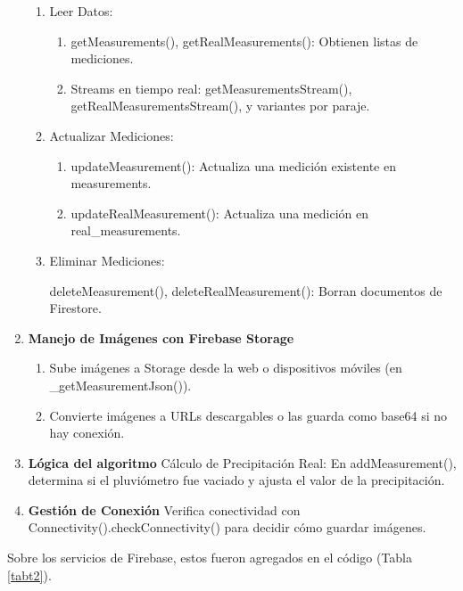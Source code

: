 \begin{enumerate}
\begin{enumerate}
    \item Leer Datos:
    
    \begin{enumerate}
    \item getMeasurements(), getRealMeasurements(): Obtienen listas de mediciones.
    
    \item Streams en tiempo real: getMeasurementsStream(), getRealMeasurementsStream(), y variantes por paraje.
    \end{enumerate}
    
    \item Actualizar Mediciones:
    
    \begin{enumerate}
      \item updateMeasurement(): Actualiza una medición existente en measurements.
    
    \item updateRealMeasurement(): Actualiza una medición en real\_measurements.
    \end{enumerate}
    
    \item Eliminar Mediciones:
    
    deleteMeasurement(), deleteRealMeasurement(): Borran documentos de Firestore.
    \end{enumerate}
    
    \item \textbf{Manejo de Imágenes con Firebase Storage}
    \begin{enumerate}
    \item Sube imágenes a Storage desde la web o dispositivos móviles (en \_getMeasurementJson()).
    
    \item Convierte imágenes a URLs descargables o las guarda como base64 si no hay conexión.
    \end{enumerate}
    
    \item \textbf{Lógica del algoritmo}
    Cálculo de Precipitación Real: En addMeasurement(), determina si el pluviómetro fue vaciado y ajusta el valor de la precipitación.
    
    \item \textbf{Gestión de Conexión}
    Verifica conectividad con Connectivity().checkConnectivity() para decidir cómo guardar imágenes.
\end{enumerate}

Sobre los servicios de Firebase, estos fueron agregados en el código (Tabla \ref{tabt2}).


